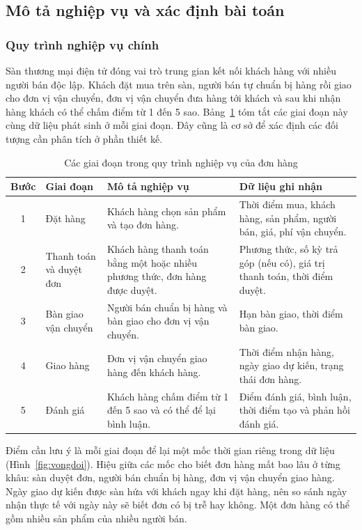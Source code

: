 \subsection{Mô tả nghiệp vụ và xác định bài toán}

\subsubsection{Quy trình nghiệp vụ chính}

Sàn thương mại điện tử đóng vai trò trung gian kết nối khách hàng với nhiều người bán độc lập. Khách đặt mua trên sàn, người bán tự chuẩn bị hàng rồi giao cho đơn vị vận chuyển, đơn vị vận chuyển đưa hàng tới khách và sau khi nhận hàng khách có thể chấm điểm từ 1 đến 5 sao. Bảng~\ref{tab:quytrinh} tóm tắt các giai đoạn này cùng dữ liệu phát sinh ở mỗi giai đoạn. Đây cũng là cơ sở để xác định các đối tượng cần phân tích ở phần thiết kế.

\begin{table}[H]
\centering
\small{}
\caption{Các giai đoạn trong quy trình nghiệp vụ của đơn hàng}
\label{tab:quytrinh}
\begin{tabularx}{\linewidth}{|c|p{3cm}|X|p{5.1cm}|}
\hline
\textbf{Bước} & \textbf{Giai đoạn} & \textbf{Mô tả nghiệp vụ} & \textbf{Dữ liệu ghi nhận}\\ \hline
1 & Đặt hàng & Khách hàng chọn sản phẩm và tạo đơn hàng. & Thời điểm mua, khách hàng, sản phẩm, người bán, giá, phí vận chuyển.\\ \hline
2 & Thanh toán và duyệt đơn & Khách hàng thanh toán bằng một hoặc nhiều phương thức, đơn hàng được duyệt. & Phương thức, số kỳ trả góp (nếu có), giá trị thanh toán, thời điểm duyệt.\\ \hline
3 & Bàn giao vận chuyển & Người bán chuẩn bị hàng và bàn giao cho đơn vị vận chuyển. & Hạn bàn giao, thời điểm bàn giao.\\ \hline
4 & Giao hàng & Đơn vị vận chuyển giao hàng đến khách hàng. & Thời điểm nhận hàng, ngày giao dự kiến, trạng thái đơn hàng.\\ \hline
5 & Đánh giá & Khách hàng chấm điểm từ 1 đến 5 sao và có thể để lại bình luận. & Điểm đánh giá, bình luận, thời điểm tạo và phản hồi đánh giá.\\ \hline
\end{tabularx}
\end{table}

Điểm cần lưu ý là mỗi giai đoạn để lại một mốc thời gian riêng trong dữ liệu (Hình~\ref{fig:vongdoi}). Hiệu giữa các mốc cho biết đơn hàng mất bao lâu ở từng khâu: sàn duyệt đơn, người bán chuẩn bị hàng, đơn vị vận chuyển giao hàng. Ngày giao dự kiến được sàn hứa với khách ngay khi đặt hàng, nên so sánh ngày nhận thực tế với ngày này sẽ biết đơn có bị trễ hay không. Một đơn hàng có thể gồm nhiều sản phẩm của nhiều người bán.

